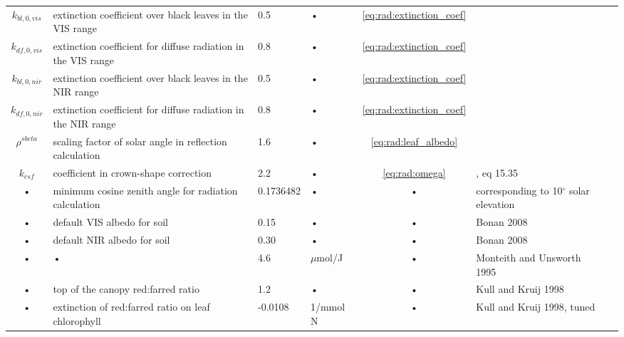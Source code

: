 \documentclass[11pt,oneside,openright,a4paper,fleqn]{book}  %
\begin{document}
\begin{table}
\begin{tabularx}{\linewidth}{|c|X|l|l|c|l|c|}
$k_{bl,0,vis}$ & extinction coefficient over black leaves in the VIS range & 0.5 & • & \ref{eq:rad:extinction_coef} & \cite{Spitters:1986tv} \\
$k_{df,0,vis}$ & extinction coefficient for diffuse radiation in the VIS range & 0.8 & • & \ref{eq:rad:extinction_coef} & \cite{Spitters:1986tv} \\
$k_{bl,0,nir}$ & extinction coefficient over black leaves in the NIR range & 0.5 & • & \ref{eq:rad:extinction_coef} & \cite{Spitters:1986tv} \\
$k_{df,0,nir}$ & extinction coefficient for diffuse radiation in the NIR range & 0.8 & • & \ref{eq:rad:extinction_coef} & \cite{Spitters:1986tv} \\
$\rho^{sbeta}$ & scaling factor of solar angle in reflection calculation& 1.6 & • & \ref{eq:rad:leaf_albedo}  & \cite{Spitters:1986tv} \\
$k_{csf}$ & coefficient in crown-shape correction & 2.2 & • & \ref{eq:rad:omega} & \cite{Campbell:1998vb}, eq 15.35 \\
• & minimum cosine zenith angle for radiation calculation & 0.1736482 & • & • & corresponding to 10$^{\circ}$ solar elevation \\
• & default VIS albedo for soil & 0.15 & • & • & Bonan 2008 \\
• & default NIR albedo for soil & 0.30 & • & • & Bonan 2008 \\
• & • & 4.6 & $\mu$mol/J & • & Monteith and Unsworth 1995 \\
• & top of the canopy red:farred ratio & 1.2 & • & • & Kull and Kruij 1998 \\
• & extinction of red:farred ratio on leaf chlorophyll & -0.0108 & 1/mmol N & • & Kull and Kruij 1998, tuned \\



\hline 
\end{tabularx}
\end{table}
\end{document}
